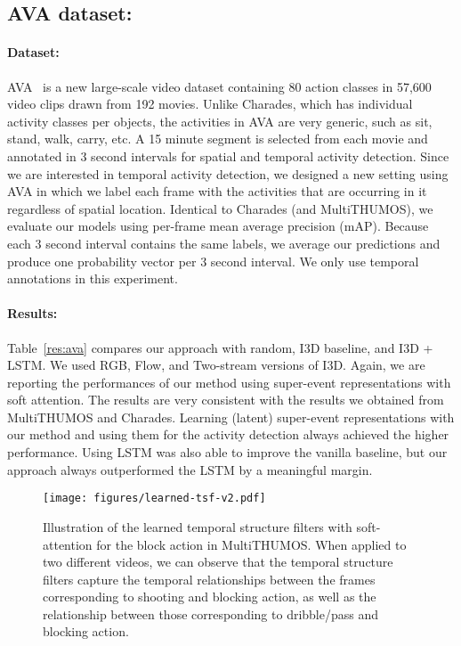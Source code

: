 \documentclass[10pt,twocolumn,letterpaper]{article}
\begin{document}
\subsection{AVA dataset:}

\paragraph{Dataset:}

AVA~\cite{ava2017} is a new large-scale video dataset containing 80 action classes in 57,600 video clips drawn from 192 movies. Unlike Charades, which has individual activity classes per objects, the activities in AVA are very generic, such as sit, stand, walk, carry, etc.  A 15 minute segment is selected from each movie and annotated in 3 second intervals for spatial and temporal activity detection. Since we are interested in temporal activity detection, we designed a new setting using AVA in which we label each frame with the activities that are occurring in it regardless of spatial location. Identical to Charades (and MultiTHUMOS), we evaluate our models using per-frame mean average precision (mAP). Because each 3 second interval contains the same labels, we average our predictions and produce one probability vector per 3 second interval. We only use temporal annotations in this experiment.

\vspace{-3pt}
\paragraph{Results:}

Table~\ref{res:ava} compares our approach with random, I3D baseline, and I3D + LSTM. We used RGB, Flow, and Two-stream versions of I3D.
Again, we are reporting the performances of our method using super-event representations with soft attention. The results are very consistent with the results we obtained from MultiTHUMOS and Charades. Learning (latent) super-event representations with our method and using them for the activity detection always achieved the higher performance. Using LSTM was also able to improve the vanilla baseline, but our approach always outperformed the LSTM by a meaningful margin.








\begin{figure*}
  \centering
    \texttt{[image: figures/learned-tsf-v2.pdf]}
      \caption{Illustration of the learned temporal structure filters with soft-attention for the block action in MultiTHUMOS. When applied to two different videos, we can observe that the temporal structure filters capture the temporal relationships between the frames corresponding to shooting and blocking action, as well as the relationship between those corresponding to dribble/pass and blocking action.}
      \label{fig:learned-multithumos}
\end{figure*}
\end{document}
